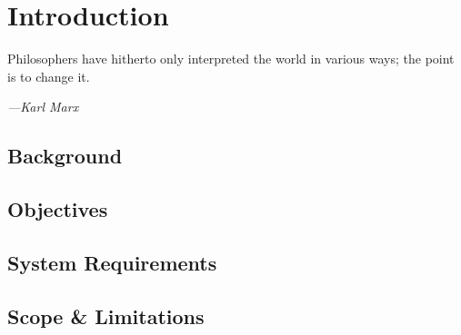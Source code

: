 \documentclass[class=report,11pt,crop=false]{standalone}
\begin{document}
\chapter{Introduction}
\epigraph{Philosophers have hitherto only interpreted the world in various ways; the point is to change it.}%
    {\emph{---Karl Marx}}


\section{Background}


\section{Objectives}

\section{System Requirements}

\section{Scope \& Limitations}
\end{document}
